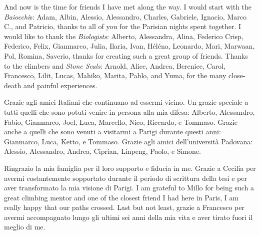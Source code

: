 And now is the time for friends I have met along the way. I would start with the \emph{Baiocchi}s:
Adam,
Albin,
Alessio,
Alessandro,
Charles,
Gabriele,
Ignacio,
Marco C., and
Patricio, thanks to all of you for the Parisian nights spent together.
I would like to thank the \emph{Biologists}:
Alberto,
Alessandra,
Alina,
Federico Crisp,
Federico,
Felix,
Gianmarco,
Julia,
Ilaria,
Ivan,
Héléna,
Leonardo,
Mari,
Marwaan,
Pol,
Romina,
Saverio, thanks for creating such a great group of friends.
Thanks to the climbers and \emph{Stone Seals}:
Arnold,
Alice,
Andrea,
Berenice,
Carol,
Francesco,
Lilit,
Lucas,
Mahiko,
Marita,
Pablo, and
Yuma,
for the many close-death and painful experiences.

Grazie agli amici Italiani che continuano ad essermi vicino.
Un grazie speciale a tutti quelli che sono potuti venire in persona alla mia difesa:
Alberto,
Alessandro,
Fabio,
Gianmarco,
Joel,
Luca,
Marcello,
Nico,
Riccardo, e
Tommaso.
Grazie anche a quelli che sono venuti a visitarmi a Parigi durante questi anni: Gianmarco, Luca, Ketto, e Tommaso.
Grazie agli amici dell'università Padovana:
Alessio,
Alessandro,
Andrea,
Ciprian,
Linpeng,
Paolo, e
Simone.

Ringrazio la mia famiglia per il loro supporto e fiducia in me. Grazie a Cecilia per avermi costantemente sopportato durante il periodo di scrittura della tesi e per aver transformato la mia visione di Parigi. I am grateful to Millo for being such a great climbing mentor and one of the closest friend I had here in Paris, I am really happy that our paths crossed. Last but not least, grazie a Francesco per avermi accompagnato lungo gli ultimi sei anni della mia vita e aver tirato fuori il meglio di me.
